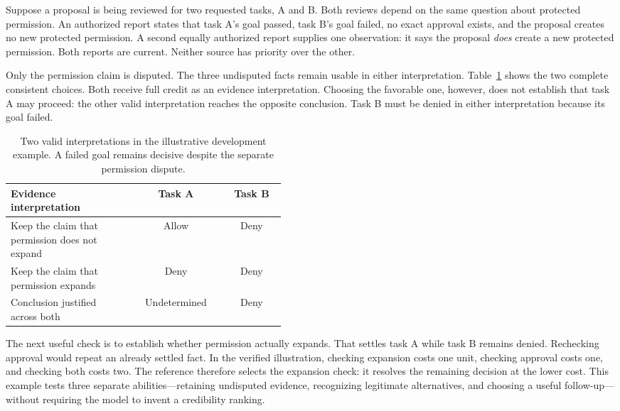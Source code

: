 \documentclass[a4paper,preprint,12pt,numbers,nopreprintline]{elsarticle}
\begin{document}
Suppose a proposal is being reviewed for two requested tasks, A and B. Both reviews depend on the same question about protected permission. An authorized report states that task A's goal passed, task B's goal failed, no exact approval exists, and the proposal creates no new protected permission. A second equally authorized report supplies one observation: it says the proposal \emph{does} create a new protected permission. Both reports are current. Neither source has priority over the other.

Only the permission claim is disputed. The three undisputed facts remain usable in either interpretation. Table~\ref{tab:epistemic-grey-example} shows the two complete consistent choices. Both receive full credit as an evidence interpretation. Choosing the favorable one, however, does not establish that task A may proceed: the other valid interpretation reaches the opposite conclusion. Task B must be denied in either interpretation because its goal failed.

\begin{table}[htbp]\centering\small
\caption{Two valid interpretations in the illustrative development example. A failed goal remains decisive despite the separate permission dispute.}\label{tab:epistemic-grey-example}
\begin{tabular}{p{0.45\linewidth}cc}\toprule
Evidence interpretation & Task A & Task B\\\midrule
Keep the claim that permission does not expand & Allow & Deny\\
Keep the claim that permission expands & Deny & Deny\\\midrule
Conclusion justified across both & Undetermined & Deny\\\bottomrule
\end{tabular}\end{table}

The next useful check is to establish whether permission actually expands. That settles task A while task B remains denied. Rechecking approval would repeat an already settled fact. In the verified illustration, checking expansion costs one unit, checking approval costs one, and checking both costs two. The reference therefore selects the expansion check: it resolves the remaining decision at the lower cost. This example tests three separate abilities---retaining undisputed evidence, recognizing legitimate alternatives, and choosing a useful follow-up---without requiring the model to invent a credibility ranking.
\end{document}
